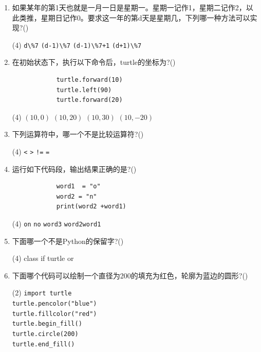 \documentclass[11pt]{ctexart}
\begin{document}
\begin{enumerate}
        \item 如果某年的第1天也就是一月一日是星期一。星期一记作1，星期二记作2，以此类推，星期日记作0。要求这一年的第d天是星期几，下列哪一种方法可以实现?(\qquad)
        \begin{tasks}(4)
            \task \lstinline!d\%7!
            \task \lstinline!(d-1)\%7!
            \task \lstinline!(d-1)\%7+1!
            \task \lstinline!(d+1)\%7!
        \end{tasks}

        \newpage
        \item 在初始状态下，执行以下命令后，turtle的坐标为?(\qquad)
        \begin{lstlisting}
            turtle.forward(10)
            turtle.left(90)
            turtle.forward(20)
        \end{lstlisting}
        \begin{tasks}(4)
            \task $(10,0)$
            \task $(10,20)$
            \task $(10,30)$
            \task $(10,-20)$
        \end{tasks}

        \item 下列运算符中，哪一个不是比较运算符?(\qquad)
        \begin{tasks}(4)
            \task \lstinline{<}
            \task \lstinline{>}
            \task \lstinline{!=}
            \task \lstinline{=}
        \end{tasks}

        \item 运行如下代码段，输出结果正确的是?(\qquad)
        \begin{lstlisting}
            word1  = "o"
            word2 = "n"
            print(word2 +word1)
        \end{lstlisting}
        \begin{tasks}(4)
            \task \lstinline{on}
            \task \lstinline{no}
            \task \lstinline{word3}
            \task \lstinline{word2word1}
        \end{tasks}

        \item 下面哪一个不是Python的保留字?(\qquad)
        \begin{tasks}(4)
            \task class
            \task if
            \task turtle
            \task or
        \end{tasks}

        \item 下面哪个代码可以绘制一个直径为200的填充为红色，轮廓为蓝边的圆形?(\qquad)
        \begin{tasks}(2)
            \task 
            \lstinline!import turtle! \\
            \lstinline!turtle.pencolor("blue")! \\
            \lstinline!turtle.fillcolor("red")! \\
            \lstinline!turtle.begin_fill()! \\
            \lstinline!turtle.circle(200)! \\
            \lstinline!turtle.end_fill()!


\end{tasks}
\end{enumerate}
\end{document}
